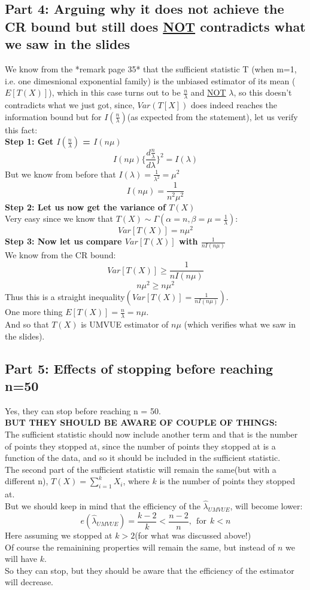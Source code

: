 \documentclass[12pt]{article}
\begin{document}
\subsection*{Part 4: Arguing why it does not achieve the CR bound but still does \underline{NOT} contradicts what we saw in the slides}
We know from the *remark page 35* that the sufficient statistic T (when m=1, i.e. one dimesnional exponential family) is the unbiased estimator of its mean ($E[T(X)]$), which in this case turns out to be $\frac{n}{\lambda}$ and \underline{NOT} $\lambda$, so this doesn't contradicts what we just got, since, $Var(T[X])$ does indeed reaches the information bound but for $I(\frac{n}{\lambda})$(as expected from the statement), let us verify this fact:\\
\textbf{Step 1: Get $I(\frac{n}{\lambda})$ = $I(n\mu)$}\\
\[
I(n\mu) \{\frac{d\frac{n}{\lambda}}{d\lambda}\}^2 = I(\lambda)
\]
But we know from before that $I(\lambda) = \frac{1}{\lambda^2} = \mu^2$
\[
I(n\mu)  = \frac{1}{n^2\mu^2}
\]
\textbf{Step 2: Let us now get the variance of $T(X)$}\\
Very easy since we know that $T(X) \sim \Gamma(\alpha = n, \beta = \mu = \frac{1}{\lambda})$:
\[
Var[T(X)] = n \mu^2
\]
\textbf{Step 3: Now let us compare $Var[T(X)]$ with $\frac{1}{nI(n\mu)}$}\\ 
We know from the CR bound:
\[
Var[T(X)] \geq \frac{1}{nI(n\mu)}
\]
\[
n\mu^2 \geq n\mu^2
\]
Thus this is a straight inequality$(Var[T(X)]=\frac{1}{nI(n\mu)})$. \\ 
One more thing $E[T(X)] = \frac{n}{\lambda} = n\mu$. \\ 
And so that $T(X)$ is UMVUE estimator of $n\mu$ (which verifies what we saw in the slides).
\subsection*{Part 5: Effects of stopping before reaching n=50}
Yes, they can stop before reaching n = 50. \\
\textbf{BUT THEY SHOULD BE AWARE OF COUPLE OF THINGS:}\\ 
The sufficient statistic should now include another term and that is the number of points they stopped at, since the number of points they stopped at is a function of the data, and so it should be included in the sufficient statistic. \\
The second part of the sufficient statistic will remain the same(but with a different n), $T(X)= \sum_{i=1}^{k}X_i$, where $k$ is the number of points they stopped at. \\
But we should keep in mind that the efficiency of the $\hat{\lambda}_{UMVUE}$, will become lower: 
\[
e(\hat{\lambda}_{UMVUE}) = \frac{k-2}{k} < \frac{n-2}{n}, \ \ \text{for} \ \ k<n 
\]
Here assuming we stopped at $k>2$(for what was discussed above!)\\ 
Of course the remainining properties will remain the same, but instead of $n$ we will have $k$. \\
So they can stop, but they should be aware that the efficiency of the estimator will decrease.
\end{document}
